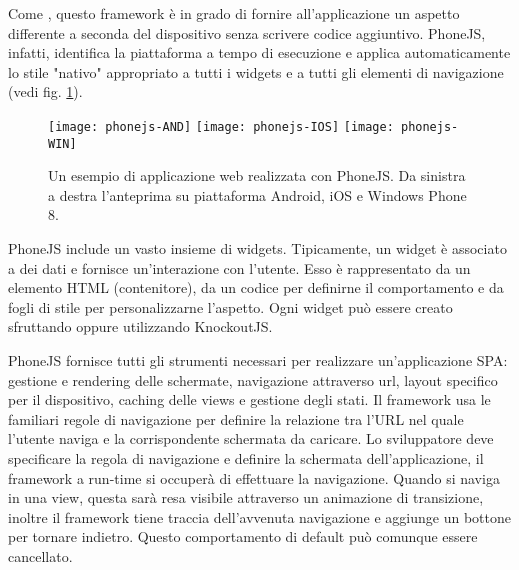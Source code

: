             Come \kendomob{}, questo frame\-work è in grado di fornire all'applicazione
            un aspetto differente a seconda del dispositivo senza scrivere codice aggiuntivo.
            PhoneJS, infatti, identifica la piattaforma a tempo di esecuzione
            e applica automaticamente
            lo stile "nativo" appropriato a tutti i widgets e a tutti gli elementi
            di navigazione (vedi fig. \ref{fig:phonejs}).

            \begin{figure}[h]
                \centering
                \texttt{[image: phonejs-AND]}
                \texttt{[image: phonejs-IOS]}
                \texttt{[image: phonejs-WIN]}
                \caption{
                    Un esempio di applicazione web realizzata con PhoneJS.
                    Da sinistra a destra l'anteprima su piattaforma Android, iOS
                    e Windows Phone 8.
                }
                \label{fig:phonejs}
            \end{figure}

            PhoneJS include un vasto insieme di widgets. Tipicamente,
            un widget è associato a dei dati e fornisce un'interazione con l'utente.
            Esso è rappresentato da un elemento HTML (contenitore), da un codice
            \js{} per definirne il comportamento e da fogli di stile \css{}
            per personalizzarne l'aspetto.
            Ogni widget può essere creato sfruttando \jq{} oppure utilizzando
            KnockoutJS.

            PhoneJS fornisce tutti gli strumenti necessari per realizzare un'applicazione
            SPA: gestione e rendering delle schermate, navigazione attraverso url,
            layout specifico per il dispositivo, caching delle views e gestione degli stati.
            Il frame\-work usa le familiari regole di navigazione per definire la
            relazione tra l'URL nel quale l'utente naviga e la corrispondente schermata
            da caricare. Lo sviluppatore deve specificare la regola di navigazione e definire
            la schermata dell'applicazione, il frame\-work a run-time si occuperà di effettuare la
            navigazione.
            Quando si naviga in una view, questa sarà resa visibile attraverso un
            animazione di transizione, inoltre il frame\-work tiene traccia dell'avvenuta
            navigazione e aggiunge un bottone per tornare indietro. Questo comportamento
            di default può comunque essere cancellato.

